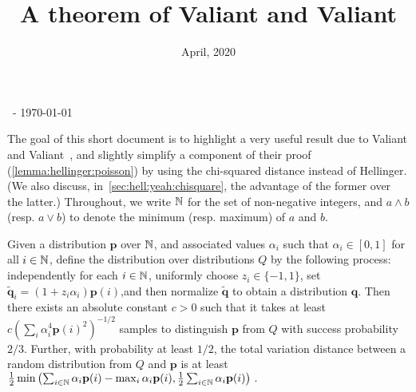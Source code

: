 \documentclass[10pt]{article}
\title{A theorem of Valiant and Valiant}
\date{April, 2020}
\newcommand{\p}{\mathbf{p}}
\newcommand{\q}{\mathbf{q}}
\begin{document}
\begin{flushleft}\sf\footnotesize
\makeatletter
\@date~- \today \hfill \@title
\makeatother
\end{flushleft}
\vspace{5mm}
The goal of this short document is to highlight a very useful result due to Valiant and Valiant~\cite{ValiantV17}, and slightly simplify a component of their proof (\autoref{lemma:hellinger:poisson}) by using the chi-squared distance instead of Hellinger. (We also discuss, in~\autoref{sec:hell:yeah:chisquare}, the advantage of the former over the latter.) Throughout, we write $\mathbb{N}$ for the set of non-negative integers, and $a\land b$ (resp. $a\lor b$) to denote the minimum (resp. maximum) of $a$ and $b$.

\begin{theorem}
        \label{theo:vv:lb}
    Given a distribution $\p$ over $\mathbb{N}$, and associated values $\alpha_i$ such that $\alpha_i \in [0,1]$ for all $i\in\mathbb{N}$, define the distribution over distributions $Q$ by the following process: independently for each $i\in\mathbb{N}$, uniformly choose $z_i\in\{-1,1\}$, set $\tilde{\q}_i=(1+z_i\alpha_i)\p(i)$,and then normalize $\tilde{\q}$ to obtain a distribution $\q$. Then there exists an absolute constant $c>0$ such that it takes at least $c(\sum_i \alpha_i^4\p(i)^2)^{-1/2}$ samples to distinguish $\p$ from $Q$ with success probability $2/3$. Further, with probability at least $1/2$, the total variation distance between a random distribution from $Q$ and $\p$ is at least 
$
    \frac{1}{2}\min\left( \sum_{i\in\N} \alpha_i\p(i) - \max_{i} \alpha_i\p(i), \frac{1}{2}\sum_{i\in\N} \alpha_i\p(i) \right)\,.
$
\end{theorem}
\end{document}
